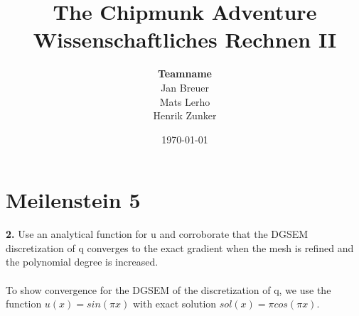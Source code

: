 \documentclass[11pt]{scrartcl}
\begin{document}


\title{{\Huge The Chipmunk Adventure} \\[18pt]
Wissenschaftliches Rechnen II \\[18pt]}
\author{ \textbf{Teamname} \\
Jan Breuer\\
Mats Lerho \\
Henrik Zunker}
\date{\today}

\maketitle



\thispagestyle{empty} %


% 

\newpage
\tableofcontents
\thispagestyle{empty}
\newpage


\section{Meilenstein 5}

\textbf{2.} Use an analytical function for u and corroborate that the DGSEM
discretization of q converges to the exact gradient when the mesh is
refined and the polynomial degree is increased.\\
\\
To show convergence for the DGSEM of the discretization of q, we use the function $u(x)=sin(\pi x)$ with exact solution $sol(x) = \pi cos(\pi x)$.
\end{document}
